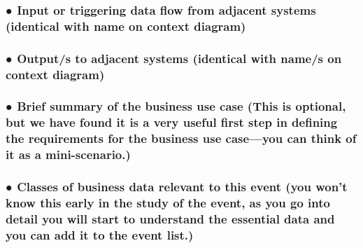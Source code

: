 \documentclass[
]{article}
\begin{document}
\hypertarget{input-or-triggering-data-flow-from-adjacent-systems-identical-with-name-on-context-diagram}{%
\subsubsection{● Input or triggering data flow from adjacent systems
(identical with name on context
diagram)}\label{input-or-triggering-data-flow-from-adjacent-systems-identical-with-name-on-context-diagram}}

\hypertarget{outputs-to-adjacent-systems-identical-with-names-on-context-diagram}{%
\subsubsection{● Output/s to adjacent systems (identical with name/s on
context
diagram)}\label{outputs-to-adjacent-systems-identical-with-names-on-context-diagram}}

\hypertarget{brief-summary-of-the-business-use-case-this-is-optional-but-we-have-found-it-is-a-very-useful-first-step-in-defining-the-requirements-for-the-business-use-caseyou-can-think-of-it-as-a-mini-scenario.}{%
\subsubsection{\texorpdfstring{● Brief summary of the business use case
(This is optional, but we have found it is a very useful first step in
defining the requirements for the business use case---you can think of
it as a mini-scenario.)
}{● Brief summary of the business use case (This is optional, but we have found it is a very useful first step in defining the requirements for the business use case---you can think of it as a mini-scenario.) }}\label{brief-summary-of-the-business-use-case-this-is-optional-but-we-have-found-it-is-a-very-useful-first-step-in-defining-the-requirements-for-the-business-use-caseyou-can-think-of-it-as-a-mini-scenario.}}

\hypertarget{classes-of-business-data-relevant-to-this-event-you-wont-know-this-early-in-the-study-of-the-event-as-you-go-into-detail-you-will-start-to-understand-the-essential-data-and-you-can-add-it-to-the-event-list.}{%
\subsubsection{\texorpdfstring{● Classes of business data relevant to
this event (you won't know this early in the study of the event, as you
go into detail you will start to understand the essential data and you
can add it to the event list.)
}{● Classes of business data relevant to this event (you won't know this early in the study of the event, as you go into detail you will start to understand the essential data and you can add it to the event list.) }}\label{classes-of-business-data-relevant-to-this-event-you-wont-know-this-early-in-the-study-of-the-event-as-you-go-into-detail-you-will-start-to-understand-the-essential-data-and-you-can-add-it-to-the-event-list.}}
\end{document}
